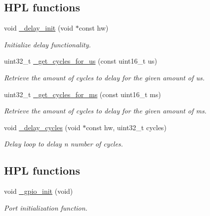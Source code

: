 \subsection*{H\+PL functions}
\begin{DoxyCompactItemize}
\item 
void \hyperlink{group___h_p_l_ga4689ea1d17db0a91e3db670687bfe640}{\+\_\+delay\+\_\+init} (void $\ast$const hw)
\begin{DoxyCompactList}\small\item\em Initialize delay functionality. \end{DoxyCompactList}\item 
uint32\+\_\+t \hyperlink{group___h_p_l_gacdb903e26206a1b890c9465e20455aef}{\+\_\+get\+\_\+cycles\+\_\+for\+\_\+us} (const uint16\+\_\+t us)
\begin{DoxyCompactList}\small\item\em Retrieve the amount of cycles to delay for the given amount of us. \end{DoxyCompactList}\item 
uint32\+\_\+t \hyperlink{group___h_p_l_gabf15f09c56b3ef75a3dbf7073092c51f}{\+\_\+get\+\_\+cycles\+\_\+for\+\_\+ms} (const uint16\+\_\+t ms)
\begin{DoxyCompactList}\small\item\em Retrieve the amount of cycles to delay for the given amount of ms. \end{DoxyCompactList}\item 
void \hyperlink{group___h_p_l_gaa9e7b0c5bb246838e100046abf186bb8}{\+\_\+delay\+\_\+cycles} (void $\ast$const hw, uint32\+\_\+t cycles)
\begin{DoxyCompactList}\small\item\em Delay loop to delay n number of cycles. \end{DoxyCompactList}\end{DoxyCompactItemize}
\subsection*{H\+PL functions}
\begin{DoxyCompactItemize}
\item 
void \hyperlink{group___h_p_l_ga6e226919d4a3ee84599b55a32597e284}{\+\_\+gpio\+\_\+init} (void)
\begin{DoxyCompactList}\small\item\em Port initialization function. \end{DoxyCompactList}\end{DoxyCompactItemize}
